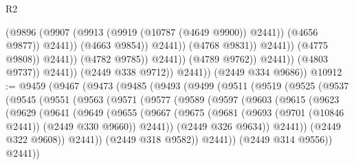 \begin{lexlean}{R2}
\begin{coremodule}
                                                  (@9896
                                                    (@9907
                                                      (@9913 (@9919 (@10787 (@4649 @9900)) @2441))
                                                      (@4656 @9877))
                                                    @2441))
                                                (@4663 @9854))
                                              @2441))
                                          (@4768 @9831))
                                        @2441))
                                    (@4775 @9808))
                                  @2441))
                              (@4782 @9785))
                            @2441))
                        (@4789 @9762))
                      @2441))
                  (@4803 @9737))
                @2441))
            (@2449 @338 @9712))
          @2441))
      (@2449 @334 @9686))
@10912 := @9459
    (@9467
      (@9473
        (@9485
          (@9493
            (@9499
              (@9511
                (@9519
                  (@9525
                    (@9537
                      (@9545
                        (@9551
                          (@9563
                            (@9571
                              (@9577
                                (@9589
                                  (@9597
                                    (@9603
                                      (@9615
                                        (@9623
                                          (@9629
                                            (@9641
                                              (@9649
                                                (@9655
                                                  (@9667
                                                    (@9675
                                                      (@9681
                                                        (@9693
                                                          (@9701 (@10846 @2441))
                                                          (@2449 @330 @9660))
                                                        @2441))
                                                    (@2449 @326 @9634))
                                                  @2441))
                                              (@2449 @322 @9608))
                                            @2441))
                                        (@2449 @318 @9582))
                                      @2441))
                                  (@2449 @314 @9556))
                                @2441))

\end{coremodule}
\end{lexlean}
